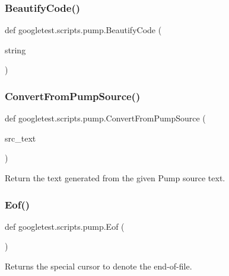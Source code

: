 \subsubsection{\texorpdfstring{BeautifyCode()}{BeautifyCode()}}
{\footnotesize\ttfamily def googletest.\+scripts.\+pump.\+Beautify\+Code (\begin{DoxyParamCaption}\item[{}]{string }\end{DoxyParamCaption})}

\mbox{\label{namespacegoogletest_1_1scripts_1_1pump_a9c55945634866ab4e8c1143909005b73}} 
\subsubsection{\texorpdfstring{ConvertFromPumpSource()}{ConvertFromPumpSource()}}
{\footnotesize\ttfamily def googletest.\+scripts.\+pump.\+Convert\+From\+Pump\+Source (\begin{DoxyParamCaption}\item[{}]{src\+\_\+text }\end{DoxyParamCaption})}

\begin{DoxyVerb}Return the text generated from the given Pump source text.\end{DoxyVerb}
 \mbox{\label{namespacegoogletest_1_1scripts_1_1pump_abae28750e9c44b59243854c9c8249717}} 
\subsubsection{\texorpdfstring{Eof()}{Eof()}}
{\footnotesize\ttfamily def googletest.\+scripts.\+pump.\+Eof (\begin{DoxyParamCaption}{ }\end{DoxyParamCaption})}

\begin{DoxyVerb}Returns the special cursor to denote the end-of-file.\end{DoxyVerb}
 \mbox{\label{namespacegoogletest_1_1scripts_1_1pump_aebdca81c221b3c1bcc5d4887ae98eaed}} 
